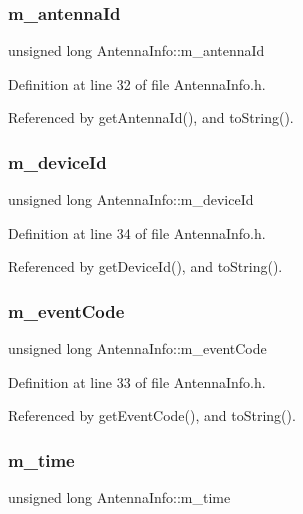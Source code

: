 \subsubsection{m\_antennaId}
{\footnotesize\ttfamily unsigned long Antenna\+Info\+::m\+\_\+antenna\+Id\hspace{0.3cm}{\ttfamily [private]}}



Definition at line 32 of file Antenna\+Info.\+h.



Referenced by get\+Antenna\+Id(), and to\+String().

\mbox{\label{class_antenna_info_a006ef0511686a6874503ff398b6bf7e8}} 
\subsubsection{m\_deviceId}
{\footnotesize\ttfamily unsigned long Antenna\+Info\+::m\+\_\+device\+Id\hspace{0.3cm}{\ttfamily [private]}}



Definition at line 34 of file Antenna\+Info.\+h.



Referenced by get\+Device\+Id(), and to\+String().

\mbox{\label{class_antenna_info_a90e054e1eb790e6b0096bf35a27bbd8e}} 
\subsubsection{m\_eventCode}
{\footnotesize\ttfamily unsigned long Antenna\+Info\+::m\+\_\+event\+Code\hspace{0.3cm}{\ttfamily [private]}}



Definition at line 33 of file Antenna\+Info.\+h.



Referenced by get\+Event\+Code(), and to\+String().

\mbox{\label{class_antenna_info_a355d929c83040e154f635ce149286b05}} 
\subsubsection{m\_time}
{\footnotesize\ttfamily unsigned long Antenna\+Info\+::m\+\_\+time\hspace{0.3cm}{\ttfamily [private]}}



